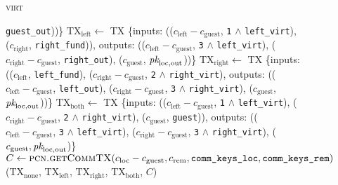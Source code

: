 \begin{figure}[H]
\begin{processbox}{\textsc{virt}}
\begin{algorithmic}[1]
        \texttt{guest\_out}))\}
        \State $\mathrm{TX}_{\mathrm{left}} \gets$ TX \{inputs:
        (($c_{\mathrm{left}} - c_{\mathrm{guest}}$, \texttt{1} $\wedge$
        \texttt{left\_virt}), ($c_{\mathrm{right}}$, \texttt{right\_fund})),
        outputs: (($c_{\mathrm{left}} - c_{\mathrm{guest}}$, \texttt{3} $\wedge$
        \texttt{left\_virt}), ($c_{\mathrm{right}} - c_{\mathrm{guest}}$,
        \texttt{right\_out}), ($c_{\mathrm{guest}}$, $\textit{pk}_{\mathrm{loc},
        \mathrm{out}}$))\}
        \State $\mathrm{TX}_{\mathrm{right}} \gets$ TX \{inputs:
        (($c_{\mathrm{left}}$, \texttt{left\_fund}), ($c_{\mathrm{right}} -
        c_{\mathrm{guest}}$, \texttt{2} $\wedge$ \texttt{right\_virt}), outputs:
        (($c_{\mathrm{left}} - c_{\mathrm{guest}}$, \texttt{left\_out}),
        ($c_{\mathrm{right}} - c_{\mathrm{guest}}$, \texttt{3} $\wedge$
        \texttt{right\_virt}), ($c_{\mathrm{guest}}$, $\textit{pk}_{\mathrm{loc},
        \mathrm{out}}$))\}
        \State $\mathrm{TX}_{\mathrm{both}} \gets$ TX \{inputs:
        (($c_{\mathrm{left}} - c_{\mathrm{guest}}$, \texttt{1} $\wedge$
        \texttt{left\_virt}), ($c_{\mathrm{right}} - c_{\mathrm{guest}}$,
        \texttt{2} $\wedge$ \texttt{right\_virt}), ($c_{\mathrm{guest}}$,
        \texttt{guest})), outputs: (($c_{\mathrm{left}} - c_{\mathrm{guest}}$,
        \texttt{3} $\wedge$ \texttt{left\_virt}), ($c_{\mathrm{right}} -
        c_{\mathrm{guest}}$, \texttt{3} $\wedge$ \texttt{right\_virt}),
        ($c_{\mathrm{guest}}, \textit{pk}_{\mathrm{loc}, \mathrm{out}}$)\}
        \State $C \gets \textsc{pcn.getCommTX}(c_{\mathrm{loc}} -
        c_{\mathrm{guest}}, c_{\mathrm{rem}}, \texttt{comm\_keys\_loc},
        \texttt{comm\_keys\_rem})$
        \State \Return ($\mathrm{TX}_{\mathrm{none}}$,
        $\mathrm{TX}_{\mathrm{left}}$, $\mathrm{TX}_{\mathrm{right}}$,
        $\mathrm{TX}_{\mathrm{both}}$, $C$)
      \EndIndent
    \end{algorithmic}
  \end{processbox}
  \caption{}
  \label{code:virtual-layer:mid-txs}
\end{figure}

